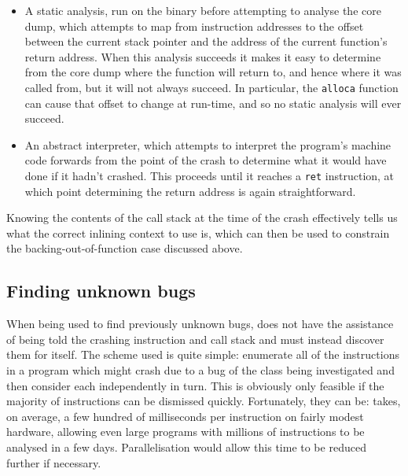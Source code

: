 \begin{itemize}
\item
  A static analysis, run on the binary before attempting to analyse
  the core dump, which attempts to map from instruction addresses to
  the offset between the current stack pointer and the address of the
  current function's return address.  When this analysis succeeds it
  makes it easy to determine from the core dump where the function
  will return to, and hence where it was called from, but it will not
  always succeed.  In particular, the \verb|alloca| function can cause
  that offset to change at run-time, and so no static analysis will
  ever succeed.
\item
  An abstract interpreter, which attempts to interpret the program's
  machine code forwards from the point of the crash to determine what
  it would have done if it hadn't crashed.  This proceeds until it
  reaches a \verb|ret| instruction, at which point determining the
  return address is again straightforward.
\end{itemize}


Knowing the contents of the call stack at the time of the crash
effectively tells us what the correct inlining context to use is,
which can then be used to constrain the backing-out-of-function case
discussed above.

\subsection{Finding unknown bugs}
\label{sect:derive:unknown_bugs}

When being used to find previously unknown bugs, {\technique} does not
have the assistance of being told the crashing instruction and call
stack and must instead discover them for itself.  The scheme used is
quite simple: enumerate all of the instructions in a program which
might crash due to a bug of the class being investigated and then
consider each independently in turn.  This is obviously only feasible
if the majority of instructions can be dismissed quickly.
Fortunately, they can be: {\implementation} takes, on average, a few
hundred of milliseconds per instruction on fairly modest hardware,
allowing even large programs with millions of instructions to be
analysed in a few days.
Parallelisation would allow this time to be reduced further if
necessary.

